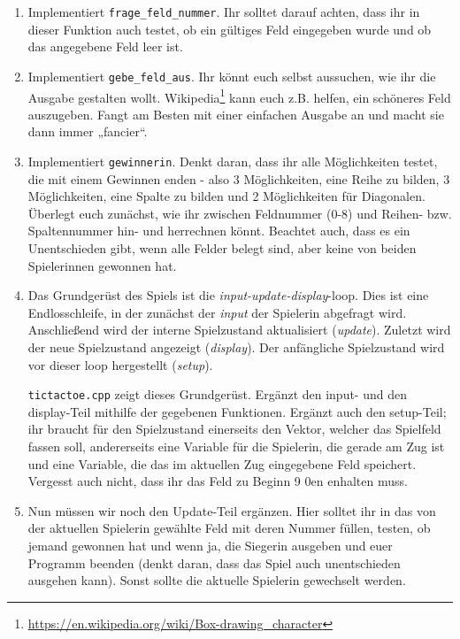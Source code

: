 \begin{praxis}
	\begin{enumerate}
		\item Implementiert \texttt{frage\_feld\_nummer}. Ihr solltet darauf
		      achten, dass ihr in dieser Funktion auch testet, ob ein gültiges
		      Feld eingegeben wurde und ob das angegebene Feld leer ist.

		\item Implementiert \texttt{gebe\_feld\_aus}. Ihr könnt euch selbst
		      aussuchen, wie ihr die Ausgabe gestalten wollt.
		      Wikipedia\footnote{\url{https://en.wikipedia.org/wiki/Box-drawing_character}}
		      kann euch z.B. helfen, ein schöneres Feld auszugeben. Fangt am Besten
		      mit einer einfachen Ausgabe an und macht sie dann immer „fancier“.

		\item Implementiert \texttt{gewinnerin}. Denkt daran, dass ihr alle
		      Möglichkeiten testet, die mit einem Gewinnen enden - also 3
		      Möglichkeiten, eine Reihe zu bilden, 3 Möglichkeiten, eine Spalte zu
		      bilden und 2 Möglichkeiten für Diagonalen. Überlegt euch zunächst, wie
		      ihr zwischen Feldnummer (0-8) und Reihen- bzw. Spaltennummer hin- und
		      herrechnen könnt. Beachtet auch, dass es ein Unentschieden gibt, wenn
		      alle Felder belegt sind, aber keine von beiden Spielerinnen gewonnen
		      hat.
		\item
		      Das Grundgerüst des Spiels ist die \emph{input-update-display}-loop.
		      Dies ist eine Endlosschleife, in der zunächst der \emph{input} der Spielerin abgefragt wird.
		      Anschließend wird der interne Spielzustand aktualisiert (\emph{update}).
		      Zuletzt wird der neue Spielzustand angezeigt (\emph{display}).
		      Der anfängliche Spielzustand wird vor dieser loop hergestellt (\emph{setup}).

		      \texttt{tictactoe.cpp} zeigt dieses Grundgerüst.
		      Ergänzt den input- und den display-Teil mithilfe der gegebenen Funktionen.
		      Ergänzt auch den setup-Teil; ihr braucht für den Spielzustand einerseits den Vektor, welcher das Spielfeld fassen soll, andererseits eine Variable für die Spielerin, die gerade am Zug ist und eine Variable, die das im aktuellen Zug eingegebene Feld speichert.
		      Vergesst auch nicht, dass ihr das Feld zu Beginn 9 0en enhalten muss.
		\item
		      Nun müssen wir noch den Update-Teil ergänzen.
		      Hier solltet ihr in das von der aktuellen Spielerin gewählte Feld mit deren Nummer füllen, testen, ob jemand gewonnen hat und wenn ja, die Siegerin ausgeben und euer Programm beenden (denkt daran, dass das Spiel auch unentschieden ausgehen kann).
		      Sonst sollte die aktuelle Spielerin gewechselt werden.
	\end{enumerate}
\end{praxis}


